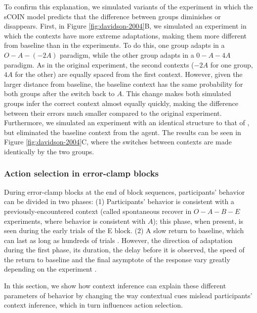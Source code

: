 \documentclass[a4paper,doc,floatsintext,natbib]{apa6}
\def \fref #1{Figure \ref{#1}}     %
\begin{document}
To confirm this explanation, we simulated variants of the experiment in which the sCOIN model predicts that the difference between groups diminishes or disappears. First, in \fref{fig:davidson-2004}B, we simulated an experiment in which the contexts have more extreme adaptations, making them more different from baseline than in the \cite{Davidson_Scaling_2004} experiments. To do this, one group adapts in a $O-A-(-2A)$ paradigm, while the other group adapts in a $0-A-4A$ paradigm. As in the original experiment, the second contexts ($-2A$ for one group, $4A$ for the other) are equally spaced from the first context. However, given the larger distance from baseline, the baseline context has the same probability for both groups after the switch back to $A$. This change makes both simulated groups infer the correct context almost equally quickly, making the difference between their errors much smaller compared to the original experiment. Furthermore, we simulated an experiment with an identical structure to that of \cite{Davidson_Scaling_2004}, but eliminated the baseline context from the agent. The results can be seen in \fref{fig:davidson-2004}C, where the switches between contexts are made identically by the two groups.

\subsubsection{Action selection in error-clamp blocks}
During error-clamp blocks at the end of block sequences, participants' behavior can be divided in two phases: (1) Participants' behavior is consistent with a previously-encountered context (called spontaneous recover in $O-A-B-E$ experiments, where behavior is consistent with $A$); this phase, when present, is seen during the early trials of the E block. (2) A slow return to baseline, which can last as long as hundreds of trials \citep{Brennan_Decay_2015}. However, the direction of adaptation during the first phase, its duration, the delay before it is observed, the speed of the return to baseline and the final asymptote of the response vary greatly depending on the experiment \citep{Brennan_Decay_2015,Vaswani_Decay_2013,Smith_Interacting_2006,Shmuelof_Overcoming_2012}.

In this section, we show how context inference can explain these different parameters of behavior by changing the way contextual cues mislead participants' context inference, which in turn influences action selection.
\end{document}
